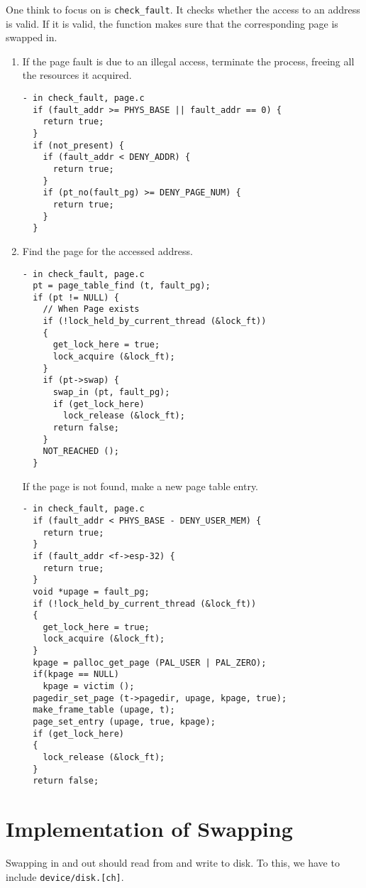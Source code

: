 \documentclass[a4paper,article,11pt,oneside]{article}
\begin{document}
One think to focus on is \texttt{check\_fault}. It checks whether the
access to an address is valid. If it is valid, the function makes sure
that the corresponding page is swapped in.
\begin{enumerate}
\item If the page fault is due to an illegal access, terminate the
  process, freeing all the resources it acquired.
\begin{verbatim}
- in check_fault, page.c
  if (fault_addr >= PHYS_BASE || fault_addr == 0) {
    return true;
  }
  if (not_present) {
    if (fault_addr < DENY_ADDR) {
      return true;
    }
    if (pt_no(fault_pg) >= DENY_PAGE_NUM) {
      return true;
    }
  }
\end{verbatim}

\item Find the page for the accessed address.
\begin{verbatim}
- in check_fault, page.c
  pt = page_table_find (t, fault_pg);
  if (pt != NULL) {
    // When Page exists
    if (!lock_held_by_current_thread (&lock_ft)) 
    {
      get_lock_here = true;
      lock_acquire (&lock_ft);
    }
    if (pt->swap) {
      swap_in (pt, fault_pg);
      if (get_lock_here) 
        lock_release (&lock_ft);
      return false;
    }
    NOT_REACHED ();
  }
\end{verbatim}

If the page is not found, make a new page table entry.
\begin{verbatim}
- in check_fault, page.c
  if (fault_addr < PHYS_BASE - DENY_USER_MEM) {
    return true;
  }
  if (fault_addr <f->esp-32) {
    return true; 
  } 
  void *upage = fault_pg; 
  if (!lock_held_by_current_thread (&lock_ft)) 
  {
    get_lock_here = true;
    lock_acquire (&lock_ft);
  }
  kpage = palloc_get_page (PAL_USER | PAL_ZERO);
  if(kpage == NULL) 
    kpage = victim ();
  pagedir_set_page (t->pagedir, upage, kpage, true);
  make_frame_table (upage, t);
  page_set_entry (upage, true, kpage);
  if (get_lock_here)
  {
    lock_release (&lock_ft);
  }
  return false;
\end{verbatim}
\end{enumerate}

\section{Implementation of Swapping}\label{secswap}
Swapping in and out should read from and write to disk. To this, we
have to include \texttt{device/disk.[ch]}.
\end{document}
